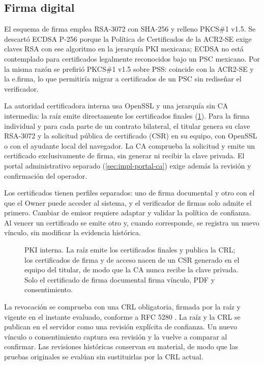 \subsection{Firma digital}\label{sec:firma-digital}

El esquema de firma emplea RSA-3072 con SHA-256 y relleno PKCS\#1 v1.5. Se descartó ECDSA P-256 porque la Política de Certificados de la ACR2-SE \cite{economia_acr2se} exige claves RSA con ese algoritmo en la jerarquía PKI mexicana; ECDSA no está contemplado para certificados legalmente reconocidos bajo un PSC mexicano. Por la misma razón se prefirió PKCS\#1 v1.5 sobre PSS: coincide con la ACR2-SE y la e.firma, lo que permitiría migrar a certificados de un PSC sin rediseñar el verificador.

La autoridad certificadora interna usa OpenSSL y una jerarquía sin CA intermedia: la raíz emite directamente los certificados finales (\cref{fig:cripto-pki}). Para la firma individual y para cada parte de un contrato bilateral, el titular genera su clave RSA-3072 y la solicitud pública de certificado (CSR) en su equipo, con OpenSSL o con el ayudante local del navegador. La CA comprueba la solicitud y emite un certificado exclusivamente de firma, sin generar ni recibir la clave privada. El portal administrativo separado (\cref{sec:impl-portal-ca}) exige además la revisión y confirmación del operador.

Los certificados tienen perfiles separados: uno de firma documental y otro con el que el Owner puede acceder al sistema, y el verificador de firmas solo admite el primero. Cambiar de emisor requiere adaptar y validar la política de confianza. Al vencer un certificado se emite otro y, cuando corresponde, se registra un nuevo vínculo, sin modificar la evidencia histórica.

\begin{figure}[!htbp]
  \centering
  
  \caption{PKI interna. La raíz emite los certificados finales y publica la CRL; los certificados de firma y de acceso nacen de un CSR generado en el equipo del titular, de modo que la CA nunca recibe la clave privada. Solo el certificado de firma documental firma vínculo, PDF y consentimiento.}
  \label{fig:cripto-pki}
\end{figure}

La revocación se comprueba con una CRL obligatoria, firmada por la raíz y vigente en el instante evaluado, conforme a RFC 5280 \cite{cooper2008}. La raíz y la CRL se publican en el servidor como una revisión explícita de confianza. Un nuevo vínculo o consentimiento captura esa revisión y la vuelve a comparar al confirmar. Las revisiones históricas conservan su material, de modo que las pruebas originales se evalúan sin sustituirlas por la CRL actual.

